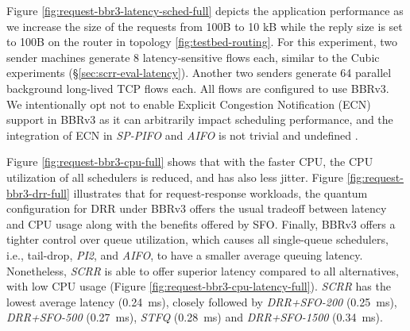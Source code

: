 Figure \ref{fig:request-bbr3-latency-sched-full} depicts the application
performance as we increase the size of the requests from 100B to 10 kB
while the reply size is set to 100B on the router in topology
\ref{fig:testbed-routing}. For this experiment, two sender machines
generate 8 latency-sensitive flows each, similar to the Cubic
experiments (\S\ref{sec:scrr-eval-latency}). Another two senders generate
64 parallel background long-lived TCP flows each. All flows are
configured to use BBRv3. We intentionally opt not to enable Explicit
Congestion Notification (ECN) \cite{ecn} support in BBRv3 as it can
arbitrarily impact scheduling performance, and the integration of ECN
in \textit{SP-PIFO} and \textit{AIFO} is not trivial and undefined \cite{pifo, aifo}.

Figure \ref{fig:request-bbr3-cpu-full} shows that with the faster CPU,
the CPU utilization of all schedulers is reduced, and has also less
jitter. Figure \ref{fig:request-bbr3-drr-full} illustrates that for
request-response workloads, the quantum configuration for DRR under
BBRv3 offers the usual tradeoff between latency and CPU usage along with the benefits offered by SFO. Finally, BBRv3 offers a tighter control over queue
utilization, which causes all single-queue schedulers, i.e.,
tail-drop, \textit{PI2}, and \textit{AIFO}, to have a smaller average
queuing latency. Nonetheless, \textit{SCRR} is able to offer superior latency
compared to all alternatives, with low CPU usage
(Figure \ref{fig:request-bbr3-cpu-latency-full}).  \textit{SCRR} has the
lowest average latency (0.24~ms), closely followed by
\textit{DRR+SFO-200} (0.25~ms), \textit{DRR+SFO-500} (0.27~ms),
\textit{STFQ} (0.28~ms) and \textit{DRR+SFO-1500} (0.34~ms).




